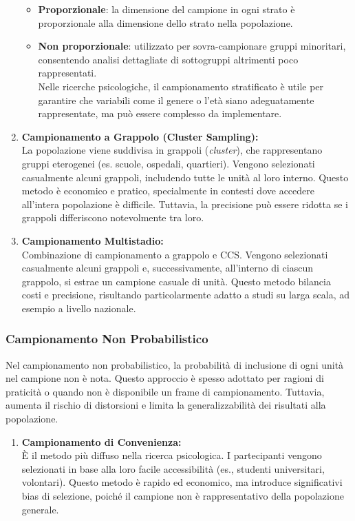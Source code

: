 \documentclass[
  letterpaper,
]{krantz}
\providecommand{\tightlist}{%
  \setlength{\itemsep}{0pt}\setlength{\parskip}{0pt}}\usepackage{longtable,booktabs,array}
\begin{document}
\begin{enumerate}
  \begin{itemize}
  \tightlist
  \item
    \textbf{Proporzionale}: la dimensione del campione in ogni strato è
    proporzionale alla dimensione dello strato nella popolazione.
  \item
    \textbf{Non proporzionale}: utilizzato per sovra-campionare gruppi
    minoritari, consentendo analisi dettagliate di sottogruppi
    altrimenti poco rappresentati.\\
    Nelle ricerche psicologiche, il campionamento stratificato è utile
    per garantire che variabili come il genere o l'età siano
    adeguatamente rappresentate, ma può essere complesso da
    implementare.
  \end{itemize}
\item
  \textbf{Campionamento a Grappolo (Cluster Sampling):}\\
  La popolazione viene suddivisa in grappoli (\emph{cluster}), che
  rappresentano gruppi eterogenei (es. scuole, ospedali, quartieri).
  Vengono selezionati casualmente alcuni grappoli, includendo tutte le
  unità al loro interno. Questo metodo è economico e pratico,
  specialmente in contesti dove accedere all'intera popolazione è
  difficile. Tuttavia, la precisione può essere ridotta se i grappoli
  differiscono notevolmente tra loro.
\item
  \textbf{Campionamento Multistadio:}\\
  Combinazione di campionamento a grappolo e CCS. Vengono selezionati
  casualmente alcuni grappoli e, successivamente, all'interno di ciascun
  grappolo, si estrae un campione casuale di unità. Questo metodo
  bilancia costi e precisione, risultando particolarmente adatto a studi
  su larga scala, ad esempio a livello nazionale.
\end{enumerate}

\subsubsection{Campionamento Non
Probabilistico}\label{campionamento-non-probabilistico}

Nel campionamento non probabilistico, la probabilità di inclusione di
ogni unità nel campione non è nota. Questo approccio è spesso adottato
per ragioni di praticità o quando non è disponibile un frame di
campionamento. Tuttavia, aumenta il rischio di distorsioni e limita la
generalizzabilità dei risultati alla popolazione.

\begin{enumerate}
\def\labelenumi{\arabic{enumi}.}
\tightlist
\item
  \textbf{Campionamento di Convenienza:}\\
  È il metodo più diffuso nella ricerca psicologica. I partecipanti
  vengono selezionati in base alla loro facile accessibilità (es.,
  studenti universitari, volontari). Questo metodo è rapido ed
  economico, ma introduce significativi bias di selezione, poiché il
  campione non è rappresentativo della popolazione generale.
\end{enumerate}
\end{document}
